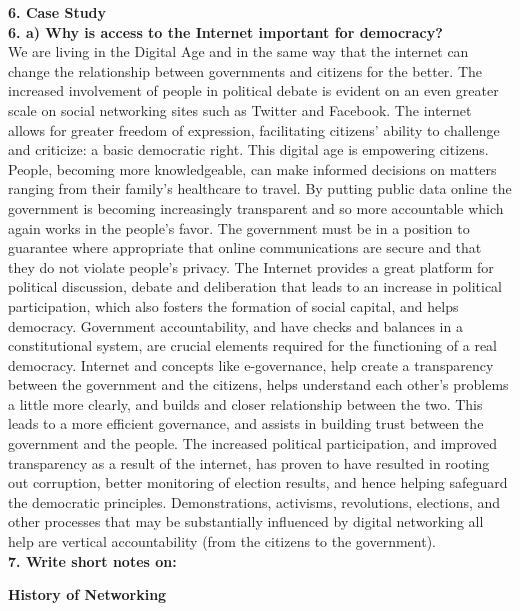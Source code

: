 \documentclass [12pt, a4paper]{article}
\begin{document}
\large
\textbf{6. Case Study}\\
\normalsize
\textbf{6. a) Why is access to the Internet important for democracy?}\\
We are living in the Digital Age and in the same way that the internet can change the relationship between governments and citizens for the better. The increased involvement of people in political debate is evident on an even greater scale on social networking sites such as Twitter and Facebook. The internet allows for greater freedom of expression, facilitating citizens' ability to challenge and criticize: a basic democratic right. This digital age is empowering citizens. People, becoming more knowledgeable, can make informed decisions on matters ranging from their family's healthcare to travel. By putting public data online the government is becoming increasingly transparent and so more accountable which again works in the people's favor. The government must be in a position to guarantee where appropriate that online communications are secure and that they do not violate people's privacy. The Internet provides a great platform for political discussion, debate and deliberation that leads to an increase in political participation, which also fosters the formation of social capital, and helps democracy. Government accountability, and have checks and balances in a constitutional system, are crucial elements required for the functioning of a real democracy. Internet and concepts like e-governance, help create a transparency between the government and the citizens, helps understand each other’s problems a little more clearly, and builds and closer relationship between the two. This leads to a more efficient governance, and assists in building trust between the government and the people. The increased political participation, and improved transparency as a result of the internet, has proven to have resulted in rooting out corruption, better monitoring of election results, and hence helping safeguard the democratic principles. Demonstrations, activisms, revolutions, elections, and other processes that may be substantially influenced by digital networking all help are vertical accountability (from the citizens to the government).\\

\large
\textbf{7. Write short notes on:}
\normalsize

\begin{center}
	\textbf{History of Networking}
\end{center}
\end{document}
